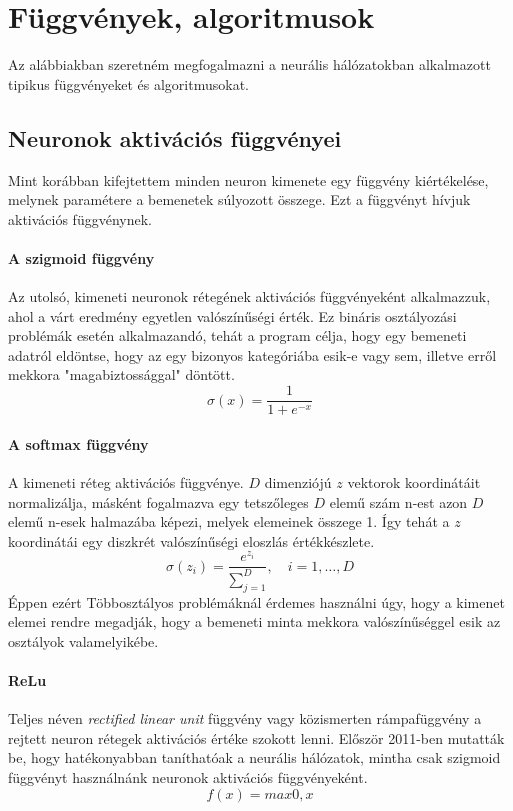 \section{Függvények, algoritmusok}
Az alábbiakban szeretném megfogalmazni a neurális hálózatokban alkalmazott tipikus függvényeket és algoritmusokat.
\subsection{Neuronok aktivációs függvényei}
Mint korábban kifejtettem minden neuron kimenete egy függvény kiértékelése, melynek paramétere a bemenetek súlyozott összege. Ezt a függvényt hívjuk aktivációs függvénynek. 

\paragraph{A szigmoid függvény}
Az utolsó, kimeneti neuronok rétegének aktivációs függvényeként alkalmazzuk, ahol a várt eredmény egyetlen valószínűségi érték. Ez bináris osztályozási problémák esetén alkalmazandó, tehát a program célja, hogy egy bemeneti adatról eldöntse, hogy az egy bizonyos kategóriába esik-e vagy sem, illetve erről mekkora "magabiztossággal" döntött.
\begin{displaymath}
	\sigma(x)= \frac{1}{1+e^{-x}}
\end{displaymath}


\paragraph{A softmax függvény} 
A kimeneti réteg aktivációs függvénye. $D$ dimenziójú $z$ vektorok koordinátáit normalizálja, másként fogalmazva egy tetszőleges $D$ elemű szám n-est azon $D$ elemű n-esek halmazába képezi, melyek elemeinek összege 1. Így tehát a $z$ koordinátái egy diszkrét valószínűségi eloszlás értékkészlete. 
\begin{displaymath}
\sigma(z_i)=\frac{e^{z_i}}{\sum_{j=1}^{D}},\quad i = 1,\dots,D
\end{displaymath}
Éppen ezért Többosztályos problémáknál érdemes használni úgy, hogy a kimenet elemei rendre megadják, hogy a bemeneti minta mekkora valószínűséggel esik az osztályok valamelyikébe.


\paragraph{ReLu}
Teljes néven \emph{rectified linear unit} függvény vagy közismerten rámpafüggvény a rejtett neuron rétegek aktivációs értéke szokott lenni. Először 2011-ben mutatták be, hogy hatékonyabban taníthatóak a neurális hálózatok, mintha csak szigmoid függvényt használnánk neuronok aktivációs függvényeként.\cite{wiki:relu}
\begin{equation}
	f(x) = max{0,x}
\end{equation}


